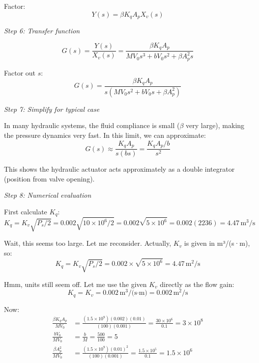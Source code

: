 \begin{example}
Factor:
\begin{equation}
[MV_0 s^3 + bV_0 s^2 + \beta A_p^2 s] Y(s) = \beta K_q A_p X_v(s)
\end{equation}

\textit{Step 6: Transfer function}

\begin{equation}
G(s) = \frac{Y(s)}{X_v(s)} = \frac{\beta K_q A_p}{MV_0 s^3 + bV_0 s^2 + \beta A_p^2 s}
\end{equation}

Factor out $s$:
\begin{equation}
G(s) = \frac{\beta K_q A_p}{s(MV_0 s^2 + bV_0 s + \beta A_p^2)}
\end{equation}

\textit{Step 7: Simplify for typical case}

In many hydraulic systems, the fluid compliance is small ($\beta$ very large), making the pressure dynamics very fast. In this limit, we can approximate:
\begin{equation}
G(s) \approx \frac{K_q A_p}{s(bs)} = \frac{K_q A_p/b}{s^2}
\end{equation}

This shows the hydraulic actuator acts approximately as a double integrator (position from valve opening).

\textit{Step 8: Numerical evaluation}

First calculate $K_q$:
\begin{equation}
K_q = K_v\sqrt{P_s/2} = 0.002\sqrt{10 \times 10^6 / 2} = 0.002\sqrt{5 \times 10^6} = 0.002(2236) = 4.47\,\text{m}^3/\text{s}
\end{equation}

Wait, this seems too large. Let me reconsider. Actually, $K_v$ is given in m³/(s·m), so:
\begin{equation}
K_q = K_v\sqrt{P_s/2} = 0.002 \times \sqrt{5 \times 10^6} = 4.47\,\text{m}^2/\text{s}
\end{equation}

Hmm, units still seem off. Let me use the given $K_v$ directly as the flow gain:
\begin{equation}
K_q = K_v = 0.002\,\text{m}^3/\text{(s·m)} = 0.002\,\text{m}^2/\text{s}
\end{equation}

Now:
\begin{align}
\frac{\beta K_q A_p}{MV_0} &= \frac{(1.5 \times 10^9)(0.002)(0.01)}{(100)(0.001)} = \frac{30 \times 10^6}{0.1} = 3 \times 10^8 \\
\frac{bV_0}{MV_0} &= \frac{b}{M} = \frac{500}{100} = 5 \\
\frac{\beta A_p^2}{MV_0} &= \frac{(1.5 \times 10^9)(0.01)^2}{(100)(0.001)} = \frac{1.5 \times 10^5}{0.1} = 1.5 \times 10^6
\end{align}


\end{example}
